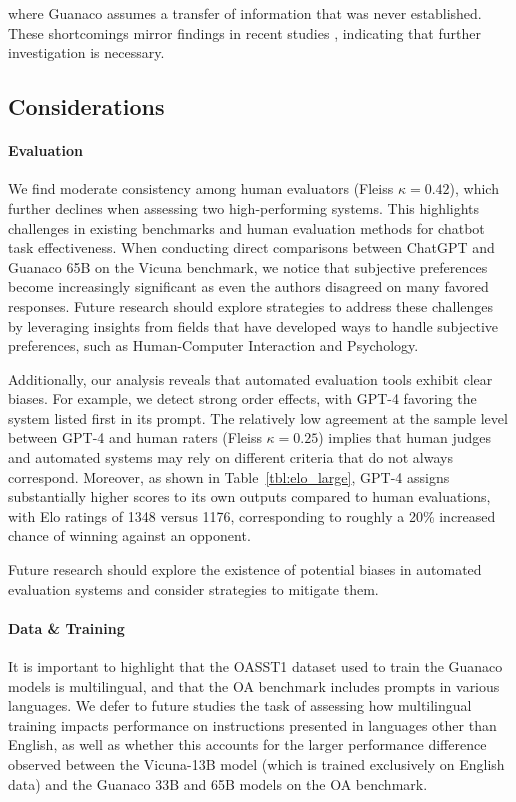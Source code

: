 where {Guanaco} assumes a transfer of information that was never established. These shortcomings mirror findings in recent studies \cite{sap2022neural}, indicating that further investigation is necessary.

\subsection{Considerations}
\label{ssec:considerations}

\paragraph{Evaluation}

We find moderate consistency among human evaluators (Fleiss $\kappa=0.42$), which further declines when assessing two high-performing systems. This highlights challenges in existing benchmarks and human evaluation methods for chatbot task effectiveness. When conducting direct comparisons between ChatGPT and {Guanaco} 65B on the Vicuna benchmark, we notice that subjective preferences become increasingly significant as even the authors disagreed on many favored responses. Future research should explore strategies to address these challenges by leveraging insights from fields that have developed ways to handle subjective preferences, such as Human-Computer Interaction and Psychology.

Additionally, our analysis reveals that automated evaluation tools exhibit clear biases. For example, we detect strong order effects, with GPT-4 favoring the system listed first in its prompt. The relatively low agreement at the sample level between GPT-4 and human raters (Fleiss $\kappa=0.25$) implies that human judges and automated systems may rely on different criteria that do not always correspond. Moreover, as shown in Table~\ref{tbl:elo_large}, GPT-4 assigns substantially higher scores to its own outputs compared to human evaluations, with Elo ratings of 1348 versus 1176, corresponding to roughly a 20\% increased chance of winning against an opponent.

Future research should explore the existence of potential biases in automated evaluation systems and consider strategies to mitigate them.

\paragraph{Data \& Training} It is important to highlight that the OASST1 dataset used to train the {Guanaco} models is multilingual, and that the OA benchmark includes prompts in various languages. We defer to future studies the task of assessing how multilingual training impacts performance on instructions presented in languages other than English, as well as whether this accounts for the larger performance difference observed between the Vicuna-13B model (which is trained exclusively on English data) and the {Guanaco} 33B and 65B models on the OA benchmark.

